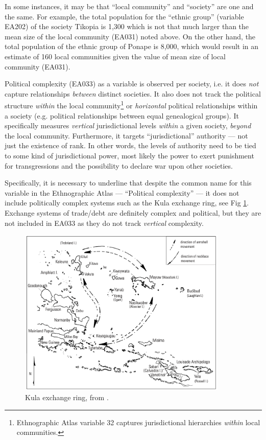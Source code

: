 \documentclass[12pt,letterpaper]{article}
\begin{document}
In some instances, it may be that ``local community'' and ``society'' are one and the same. For example, the total population for the ``ethnic group'' (variable EA202) of the society Tikopia is 1,300 which is not that much larger than the mean size of the local community (EA031) noted above. On the other hand, the total population of the ethnic group of Ponape is 8,000, which would result in an estimate of 160 local communities given the value of mean size of local community (EA031).
  
Political complexity (EA033) as a variable is observed per society, i.e. it does \emph{not} capture relationships \emph{between} distinct societies. It also does not track the political structure \emph{within} the local community\footnote{Ethnographic Atlas variable 32 captures jurisdictional hierarchies \emph{within} local communities.} or \emph{horizontal} political relationships within a society (e.g. political relationships between equal genealogical groups). It specifically measures \emph{vertical} jurisdictional levels \emph{within} a given society, \emph{beyond} the local community. Furthermore, it targets ``jurisdictional'' authority --- not just the existence of rank. In other words, the levels of authority need to be tied to some kind of jurisdictional power, most likely the power to exert punishment for transgressions and the possibility to declare war upon other societies. 

Specifically, it is necessary to underline that despite the common name for this variable in the Ethnographic Atlas --- ``Political complexity'' --- it does not include politically complex systems such as the Kula exchange ring\citet{damon2002kula}, see Fig \ref{kula_ring}. Exchange systems of trade/debt are definitely complex and political, but they are not included in EA033 as they do not track \emph{vertical} complexity.

\begin{figure}[ht]
\centering
\includegraphics[width=10cm]{latex/kula_ring_damon.png}
\caption{Kula exchange ring, from \citet{damon2002kula}.}
\label{kula_ring}
\end{figure}
\end{document}
